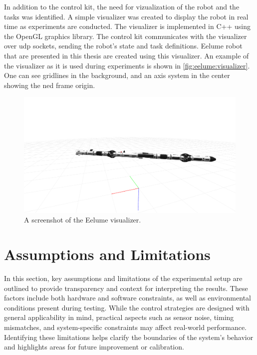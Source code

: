 In addition to the control kit, the need for vizualization of the robot and
the tasks was identified. A simple visualizer was created to display the robot
in real time as experiments are conducted. The visualizer is implemented in
C++ using the OpenGL graphics library. The control kit communicates with the
visualizer over \gls{udp} sockets, sending the robot's state and task definitions.
Eelume robot that are presented in this thesis are created using this visualizer.
An example of the visualizer as it is used during experiments is shown in
\autoref{fig:eelume:visualizer}. One can see gridlines in the background, and
an axis system in the center showing the \gls{ned} frame origin.
\begin{figure}[h!]
    \centering
    \includegraphics[width=\textwidth]{assets/eely-visualizer.png}
    \caption{A screenshot of the Eelume visualizer.}
    \label{fig:eelume:visualizer}
\end{figure}

\section{Assumptions and Limitations}
\label{sec:experimental_setup:assumptions_and_limitations}
In this section, key assumptions and limitations of the experimental setup are 
outlined to provide transparency and context for interpreting the results. 
These factors include both hardware and software constraints, as well as 
environmental conditions present during testing. While the control strategies 
are designed with general applicability in mind, practical aspects such as 
sensor noise, timing mismatches, and system-specific constraints may affect 
real-world performance. Identifying these limitations helps clarify the 
boundaries of the system's behavior and highlights areas for future 
improvement or calibration.


